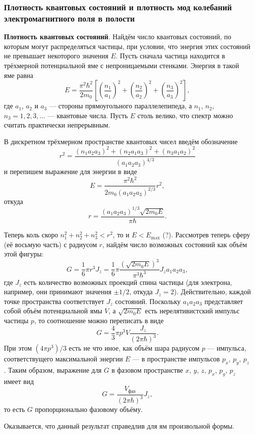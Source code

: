 \subsubsection{Плотность квантовых состояний и плотность мод колебаний электромагнитного поля в полости}
\textbf{Плотность квантовых состояний}.
Найдём число квантовых состояний, по которым могут распределяться частицы, при
условии, что энергия этих состояний не превышает некоторого значения $ E $.
Пусть сначала частица находится в трёхмерной потенциальной яме с непроницаемыми
стенками. Энергия в такой яме равна 
\[
  E = \frac{\pi^2\hbar^2}{2m_0} \left[ \left( \frac{n_1}{a_1} \right)^2 + \left(
  \frac{n_2}{a_2}\right)^2 + \left( \frac{n_3}{a_3} \right)^2   \right],
\]
где $ a_1 $, $ a_2 $ и $ a_3 $ --- стороны прямоугольного параллелепипеда, а $
n_1 $, $ n_2 $, $ n_3 = 1, 2, 3,\ldots$ --- квантовые числа. Пусть $ E $ столь
велико, что спектр можно считать практически непрерывным.

В дискретном трёхмерном пространстве квантовых чисел введём обозначение  
\[
  r^2 = \frac{(n_1a_2a_3)^2 + (n_2a_1a_3)^2 + (n_3a_1a_2)^2}{(a_1a_2a_3)^{4/3}}
\]
и перепишем выражение для энергии в виде 
\[
  E = \frac{\pi^2\hbar^2}{2m_0(a_1a_2a_3)^{2/3}}r^2,
\]
откуда 
\[
  r = \frac{(a_1a_2a_3)^{1/3}\sqrt{2m_0E}}{\pi\hbar}.
\]

Теперь коль скоро $ n_1^2 + n_2^2 + n_3^2 < r^2 $, то и $ E < E_{\max} $ (?). Рассмотрев теперь сферу (её восьмую часть) с радиусом $ r $, найдём число
возможных состояний как объём этой фигуры:
\[
  G = \frac{1}{6}\pi r^3 J_z = \frac{1}{6} \pi \frac{ \left( \sqrt{2m_0E}
  \right)^3 }{\pi^3\hbar^3}J_z a_1a_2a_3,
\]
где $ J_z $ есть количество возможных проекций спина частицы (для электрона,
например, они принимают значения $ \pm 1/2 $, откуда $ J_z = 2 $).
Действительно, каждой точке пространства соответствует $ J_z $ состояний.
Поскольку $ a_1a_2a_3 $ представляет собой объём потенциальной ямы $ V $, а $
\sqrt{2m_0E} $ есть нерелятивистский импульс частицы $ p $, то соотношение можно
переписать в виде 
\[
  G = \frac{4}{3} \pi p^3 V \frac{J_z}{(2\pi\hbar)^3}.
\]
При этом $ (4\pi p^3)/3 $ есть не что иное, как объём шара радиусом $ p $
--- импульса, соответствущего максимальной энергии $ E $ --- в пространстве
импульсов $ p_x $, $ p_y $, $ p_z $. Таким образом, выражение для $ G $ в
фазовом пространстве $ x $, $ y $, $ z $, $ p_x $, $ p_y $, $ p_z $ имеет вид 
\[
  G = \frac{V_{\text{фаз}}}{(2\pi \hbar)^3} J_z,
\]
то есть $ G $ пропорционально фазовому объёму.

Оказывается, что данный результат справедлив для ям произвольной формы.

